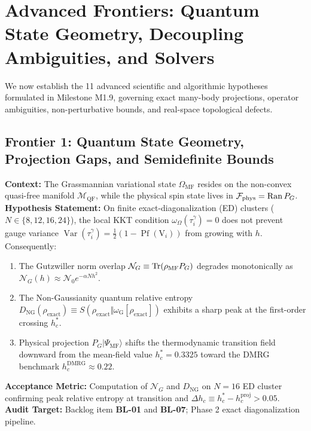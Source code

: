 \section{Advanced Frontiers: Quantum State Geometry, Decoupling Ambiguities, and Solvers}
\label{sec:advanced_frontier_hypotheses}

We now establish the 11 advanced scientific and algorithmic hypotheses formulated in Milestone M1.9, governing exact many-body projections, operator ambiguities, non-perturbative bounds, and real-space topological defects.

\subsection{Frontier 1: Quantum State Geometry, Projection Gaps, and Semidefinite Bounds}

\begin{contract}
\label{con:h1_gutzwiller_gap}
\textbf{Context:} The Grassmannian variational state $\Omega_{\mathrm{MF}}$ resides on the non-convex quasi-free manifold $\mathcal{M}_{\mathrm{QF}}$, while the physical spin state lives in $\mathcal{F}_{\mathrm{phys}} = \operatorname{Ran} P_G$.
\textbf{Hypothesis Statement:} On finite exact-diagonalization (ED) clusters ($N \in \{8, 12, 16, 24\}$), the local KKT condition $\omega_\Omega(\tau_i^\gamma) = 0$ does not prevent gauge variance $\operatorname{Var}(\tau_i^\gamma) = \frac{1}{2}(1 - \operatorname{Pf}(\mathrm{V}_i))$ from growing with $h$. Consequently:
\begin{enumerate}
\item The Gutzwiller norm overlap $\mathcal{N}_G \equiv \operatorname{Tr}(\rho_{\mathrm{MF}} P_G)$ degrades monotonically as $\mathcal{N}_G(h) \approx \mathcal{N}_0 e^{-\alpha N h^2}$.
\item The Non-Gaussianity quantum relative entropy $D_{\mathrm{NG}}(\rho_{\mathrm{exact}}) \equiv S(\rho_{\mathrm{exact}} \Vert \omega_{\mathrm{G}}[\rho_{\mathrm{exact}}])$ exhibits a sharp peak at the first-order crossing $h_c^*$.
\item Physical projection $P_G |\Psi_{\mathrm{MF}}\rangle$ shifts the thermodynamic transition field downward from the mean-field value $h_c^* = 0.3325$ toward the DMRG benchmark $h_c^{\mathrm{DMRG}} \approx 0.22$.
\end{enumerate}
\textbf{Acceptance Metric:} Computation of $\mathcal{N}_G$ and $D_{\mathrm{NG}}$ on $N=16$ ED cluster confirming peak relative entropy at transition and $\Delta h_c \equiv h_c^* - h_c^{\mathrm{proj}} > 0.05$.
\textbf{Audit Target:} Backlog item \textbf{BL-01} and \textbf{BL-07}; Phase 2 exact diagonalization pipeline.
\end{contract}

